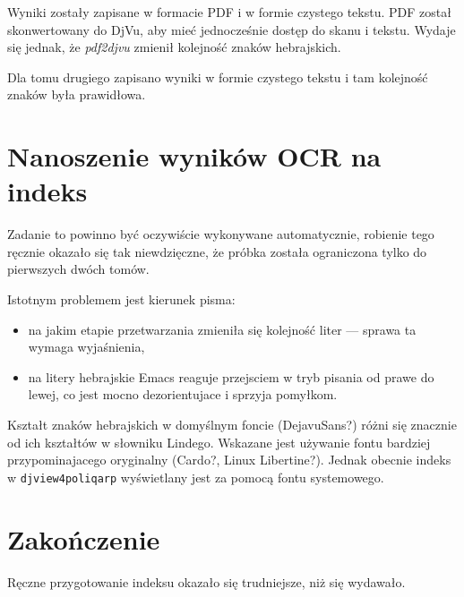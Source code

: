 \documentclass[12]{mwart}
\begin{document}
Wyniki zostały zapisane w formacie PDF i w formie czystego tekstu. PDF
został skonwertowany do DjVu, aby mieć jednocześnie dostęp do skanu i
tekstu. Wydaje się jednak, że \textit{pdf2djvu} zmienił kolejność
znaków hebrajskich.

Dla tomu drugiego zapisano wyniki w formie czystego tekstu i tam
kolejność znaków była prawidłowa.

\section{Nanoszenie wyników OCR na indeks}
\label{sec:nanosz-wynik-ocr}

Zadanie to powinno być oczywiście wykonywane automatycznie, robienie
tego ręcznie okazało się tak niewdzięczne, że próbka została
ograniczona tylko do pierwszych dwóch tomów.

Istotnym problemem jest kierunek pisma:
\begin{itemize}
\item na jakim etapie przetwarzania zmieniła się kolejność liter ---
  sprawa ta wymaga wyjaśnienia,
\item na litery hebrajskie Emacs reaguje przejsciem w tryb pisania od
  prawe do lewej, co jest mocno dezorientujace i sprzyja pomyłkom.
\end{itemize}

Kształt znaków hebrajskich w domyślnym foncie (DejavuSans?) różni się
znacznie od ich kształtów w słowniku Lindego. Wskazane jest używanie
fontu bardziej przypominajacego oryginalny (Cardo?, Linux
Libertine?). Jednak obecnie indeks w \texttt{djview4poliqarp}
wyświetlany jest za pomocą fontu systemowego.

\section{Zakończenie}
\label{sec:zakoczenie}

Ręczne przygotowanie indeksu okazało się trudniejsze, niż się
wydawało.
\end{document}

